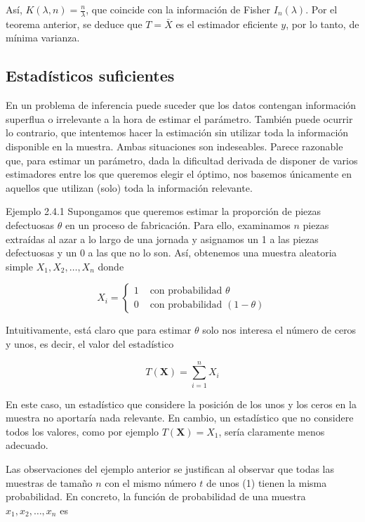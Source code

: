 \documentclass[
]{article}
\begin{document}
Así, \(K(\lambda, n)=\frac{n}{\lambda}\), que coincide con la información de Fisher \(I_{n}(\lambda)\). Por el teorema anterior, se deduce que \(T=\bar{X}\) es el estimador eficiente \(y\), por lo tanto, de mínima varianza.

\subsection{Estadísticos suficientes}\label{estaduxedsticos-suficientes}

En un problema de inferencia puede suceder que los datos contengan información superflua o irrelevante a la hora de estimar el parámetro. También puede ocurrir lo contrario, que intentemos hacer la estimación sin utilizar toda la información disponible en la muestra. Ambas situaciones son indeseables. Parece razonable que, para estimar un parámetro, dada la dificultad derivada de disponer de varios estimadores entre los que queremos elegir el óptimo, nos basemos únicamente en aquellos que utilizan (solo) toda la información relevante.

Ejemplo 2.4.1 Supongamos que queremos estimar la proporción de piezas defectuosas \(\theta\) en un proceso de fabricación. Para ello, examinamos \(n\) piezas extraídas al azar a lo largo de una jornada y asignamos un 1 a las piezas defectuosas y un 0 a las que no lo son. Así, obtenemos una muestra aleatoria simple \(X_{1}, X_{2}, \ldots, X_{n}\) donde

\[
X_{i}= \begin{cases}1 & \text { con probabilidad } \theta \\ 0 & \text { con probabilidad }(1-\theta)\end{cases}
\]

Intuitivamente, está claro que para estimar \(\theta\) solo nos interesa el número de ceros y unos, es decir, el valor del estadístico

\[
T(\mathbf{X})=\sum_{i=1}^{n} X_{i}
\]

En este caso, un estadístico que considere la posición de los unos y los ceros en la muestra no aportaría nada relevante. En cambio, un estadístico que no considere todos los valores, como por ejemplo \(T(\mathbf{X})=X_{1}\), sería claramente menos adecuado.

Las observaciones del ejemplo anterior se justifican al observar que todas las muestras de tamaño \(n\) con el mismo número \(t\) de unos (1) tienen la misma probabilidad. En concreto, la función de probabilidad de una muestra \(x_{1}, x_{2}, \ldots, x_{n}\) es
\end{document}
